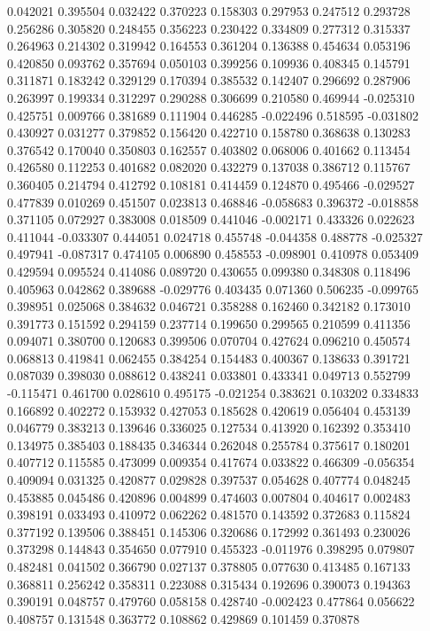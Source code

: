 0.042021
0.395504
0.032422
0.370223
0.158303
0.297953
0.247512
0.293728
0.256286
0.305820
0.248455
0.356223
0.230422
0.334809
0.277312
0.315337
0.264963
0.214302
0.319942
0.164553
0.361204
0.136388
0.454634
0.053196
0.420850
0.093762
0.357694
0.050103
0.399256
0.109936
0.408345
0.145791
0.311871
0.183242
0.329129
0.170394
0.385532
0.142407
0.296692
0.287906
0.263997
0.199334
0.312297
0.290288
0.306699
0.210580
0.469944
-0.025310
0.425751
0.009766
0.381689
0.111904
0.446285
-0.022496
0.518595
-0.031802
0.430927
0.031277
0.379852
0.156420
0.422710
0.158780
0.368638
0.130283
0.376542
0.170040
0.350803
0.162557
0.403802
0.068006
0.401662
0.113454
0.426580
0.112253
0.401682
0.082020
0.432279
0.137038
0.386712
0.115767
0.360405
0.214794
0.412792
0.108181
0.414459
0.124870
0.495466
-0.029527
0.477839
0.010269
0.451507
0.023813
0.468846
-0.058683
0.396372
-0.018858
0.371105
0.072927
0.383008
0.018509
0.441046
-0.002171
0.433326
0.022623
0.411044
-0.033307
0.444051
0.024718
0.455748
-0.044358
0.488778
-0.025327
0.497941
-0.087317
0.474105
0.006890
0.458553
-0.098901
0.410978
0.053409
0.429594
0.095524
0.414086
0.089720
0.430655
0.099380
0.348308
0.118496
0.405963
0.042862
0.389688
-0.029776
0.403435
0.071360
0.506235
-0.099765
0.398951
0.025068
0.384632
0.046721
0.358288
0.162460
0.342182
0.173010
0.391773
0.151592
0.294159
0.237714
0.199650
0.299565
0.210599
0.411356
0.094071
0.380700
0.120683
0.399506
0.070704
0.427624
0.096210
0.450574
0.068813
0.419841
0.062455
0.384254
0.154483
0.400367
0.138633
0.391721
0.087039
0.398030
0.088612
0.438241
0.033801
0.433341
0.049713
0.552799
-0.115471
0.461700
0.028610
0.495175
-0.021254
0.383621
0.103202
0.334833
0.166892
0.402272
0.153932
0.427053
0.185628
0.420619
0.056404
0.453139
0.046779
0.383213
0.139646
0.336025
0.127534
0.413920
0.162392
0.353410
0.134975
0.385403
0.188435
0.346344
0.262048
0.255784
0.375617
0.180201
0.407712
0.115585
0.473099
0.009354
0.417674
0.033822
0.466309
-0.056354
0.409094
0.031325
0.420877
0.029828
0.397537
0.054628
0.407774
0.048245
0.453885
0.045486
0.420896
0.004899
0.474603
0.007804
0.404617
0.002483
0.398191
0.033493
0.410972
0.062262
0.481570
0.143592
0.372683
0.115824
0.377192
0.139506
0.388451
0.145306
0.320686
0.172992
0.361493
0.230026
0.373298
0.144843
0.354650
0.077910
0.455323
-0.011976
0.398295
0.079807
0.482481
0.041502
0.366790
0.027137
0.378805
0.077630
0.413485
0.167133
0.368811
0.256242
0.358311
0.223088
0.315434
0.192696
0.390073
0.194363
0.390191
0.048757
0.479760
0.058158
0.428740
-0.002423
0.477864
0.056622
0.408757
0.131548
0.363772
0.108862
0.429869
0.101459
0.370878
